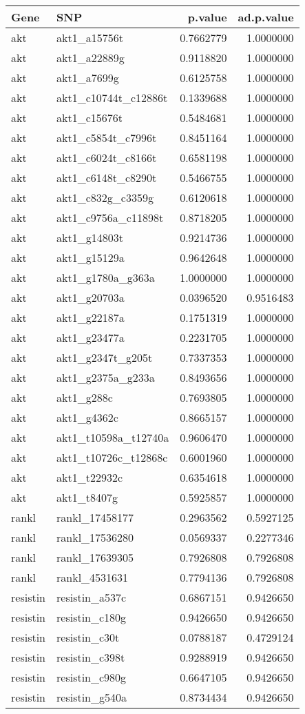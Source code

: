 \documentclass[
]{article}
\begin{document}
\begin{longtable}[]{@{}llrr@{}}
\toprule()
Gene & SNP & p.value & ad.p.value \\
\midrule()
\endhead
akt & akt1\_a15756t & 0.7662779 & 1.0000000 \\
akt & akt1\_a22889g & 0.9118820 & 1.0000000 \\
akt & akt1\_a7699g & 0.6125758 & 1.0000000 \\
akt & akt1\_c10744t\_c12886t & 0.1339688 & 1.0000000 \\
akt & akt1\_c15676t & 0.5484681 & 1.0000000 \\
akt & akt1\_c5854t\_c7996t & 0.8451164 & 1.0000000 \\
akt & akt1\_c6024t\_c8166t & 0.6581198 & 1.0000000 \\
akt & akt1\_c6148t\_c8290t & 0.5466755 & 1.0000000 \\
akt & akt1\_c832g\_c3359g & 0.6120618 & 1.0000000 \\
akt & akt1\_c9756a\_c11898t & 0.8718205 & 1.0000000 \\
akt & akt1\_g14803t & 0.9214736 & 1.0000000 \\
akt & akt1\_g15129a & 0.9642648 & 1.0000000 \\
akt & akt1\_g1780a\_g363a & 1.0000000 & 1.0000000 \\
akt & akt1\_g20703a & 0.0396520 & 0.9516483 \\
akt & akt1\_g22187a & 0.1751319 & 1.0000000 \\
akt & akt1\_g23477a & 0.2231705 & 1.0000000 \\
akt & akt1\_g2347t\_g205t & 0.7337353 & 1.0000000 \\
akt & akt1\_g2375a\_g233a & 0.8493656 & 1.0000000 \\
akt & akt1\_g288c & 0.7693805 & 1.0000000 \\
akt & akt1\_g4362c & 0.8665157 & 1.0000000 \\
akt & akt1\_t10598a\_t12740a & 0.9606470 & 1.0000000 \\
akt & akt1\_t10726c\_t12868c & 0.6001960 & 1.0000000 \\
akt & akt1\_t22932c & 0.6354618 & 1.0000000 \\
akt & akt1\_t8407g & 0.5925857 & 1.0000000 \\
rankl & rankl\_17458177 & 0.2963562 & 0.5927125 \\
rankl & rankl\_17536280 & 0.0569337 & 0.2277346 \\
rankl & rankl\_17639305 & 0.7926808 & 0.7926808 \\
rankl & rankl\_4531631 & 0.7794136 & 0.7926808 \\
resistin & resistin\_a537c & 0.6867151 & 0.9426650 \\
resistin & resistin\_c180g & 0.9426650 & 0.9426650 \\
resistin & resistin\_c30t & 0.0788187 & 0.4729124 \\
resistin & resistin\_c398t & 0.9288919 & 0.9426650 \\
resistin & resistin\_c980g & 0.6647105 & 0.9426650 \\
resistin & resistin\_g540a & 0.8734434 & 0.9426650 \\
\bottomrule()
\end{longtable}
\end{document}
